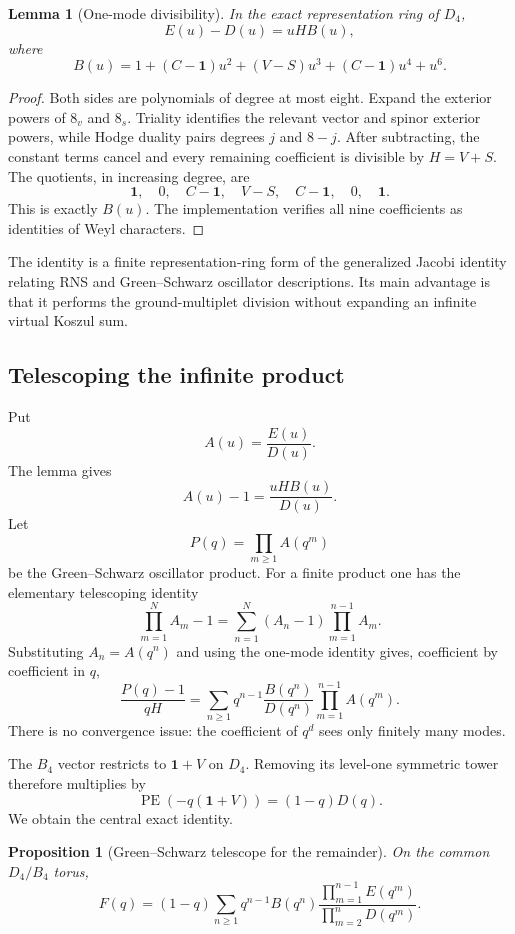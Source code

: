 \documentclass[11pt,a4paper]{article}
\newtheorem{lemma}[theorem]{Lemma}
\newtheorem{proposition}[theorem]{Proposition}
\theoremstyle{definition}
\newcommand{\PE}{\operatorname{PE}}
\newcommand{\one}{\mathbf{1}}
\begin{document}
\begin{lemma}[One-mode divisibility]
In the exact representation ring of $D_4$,
\[
   E(u)-D(u)=uH B(u),
\]
where
\[
   B(u)=1+(C-\one)u^2+(V-S)u^3+(C-\one)u^4+u^6.
\]
\end{lemma}

\begin{proof}
Both sides are polynomials of degree at most eight.  Expand the exterior
powers of $8_v$ and $8_s$.  Triality identifies the relevant vector and
spinor exterior powers, while Hodge duality pairs degrees $j$ and $8-j$.
After subtracting, the constant terms cancel and every remaining coefficient
is divisible by $H=V+S$.  The quotients, in increasing degree, are
\[
   \one,\quad 0,\quad C-\one,\quad V-S,
   \quad C-\one,\quad 0,\quad\one.
\]
This is exactly $B(u)$.  The implementation verifies all nine coefficients
as identities of Weyl characters.
\end{proof}

The identity is a finite representation-ring form of the generalized Jacobi
identity relating RNS and Green--Schwarz oscillator descriptions.  Its main
advantage is that it performs the ground-multiplet division without expanding
an infinite virtual Koszul sum.

\subsection{Telescoping the infinite product}

Put
\[
   A(u)=\frac{E(u)}{D(u)}.
\]
The lemma gives
\[
   A(u)-1=\frac{uH B(u)}{D(u)}.
\]
Let
\[
   P(q)=\prod_{m\geq1}A(q^m)
\]
be the Green--Schwarz oscillator product.  For a finite product one has the
elementary telescoping identity
\[
   \prod_{m=1}^{N}A_m-1
   =\sum_{n=1}^{N}(A_n-1)\prod_{m=1}^{n-1}A_m.
\]
Substituting $A_n=A(q^n)$ and using the one-mode identity gives, coefficient
by coefficient in $q$,
\[
 \frac{P(q)-1}{qH}
 =\sum_{n\geq1}q^{n-1}\frac{B(q^n)}{D(q^n)}
   \prod_{m=1}^{n-1}A(q^m).
\]
There is no convergence issue: the coefficient of $q^d$ sees only finitely
many modes.

The $B_4$ vector restricts to $\one+V$ on $D_4$.  Removing its level-one
symmetric tower therefore multiplies by
\[
   \PE(-q(\one+V))=(1-q)D(q).
\]
We obtain the central exact identity.

\begin{proposition}[Green--Schwarz telescope for the remainder]
On the common $D_4/B_4$ torus,
\begin{equation}
\label{eq:telescope}
 F(q)=(1-q)\sum_{n\geq1}q^{n-1}B(q^n)
 \frac{\displaystyle\prod_{m=1}^{n-1}E(q^m)}
      {\displaystyle\prod_{m=2}^{n}D(q^m)}.
\end{equation}
\end{proposition}
\end{document}
